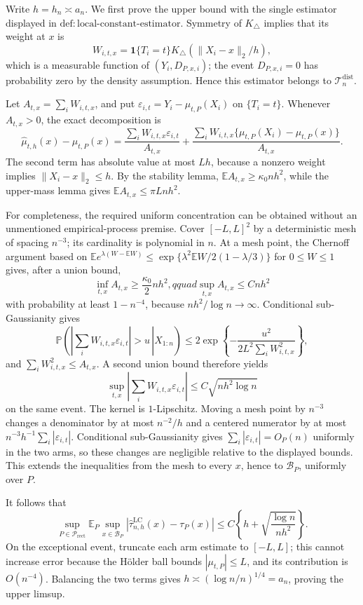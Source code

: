 Write \(h=h_n\asymp a_n\).  We first prove the upper bound with the single estimator displayed in \(\mathrm{def:local\text{-}constant\text{-}estimator}\).  Symmetry of \(K_\triangle\) implies that its weight at \(x\) is
\[
 W_{i,t,x}=\mathbf 1\{T_i=t\}K_\triangle(\lVert X_i-x\rVert_2/h),
\]
which is a measurable function of \((Y_i,D_{P,x,i})\); the event \(D_{P,x,i}=0\) has probability zero by the density assumption.  Hence this estimator belongs to \(\mathcal T_n^{\mathrm{dist}}\).

Let \(A_{t,x}=\sum_iW_{i,t,x}\), and put \(\varepsilon_{i,t}=Y_i-\mu_{t,P}(X_i)\) on \(\{T_i=t\}\).  Whenever \(A_{t,x}>0\), the exact decomposition is
\[
 \widehat\mu_{t,h}(x)-\mu_{t,P}(x)
 =\frac{\sum_iW_{i,t,x}\varepsilon_{i,t}}{A_{t,x}}
 +\frac{\sum_iW_{i,t,x}\{\mu_{t,P}(X_i)-\mu_{t,P}(x)\}}{A_{t,x}}.
\]
The second term has absolute value at most \(Lh\), because a nonzero weight implies \(\lVert X_i-x\rVert_2\leq h\).  By the stability lemma,
\(\mathbb EA_{t,x}\geq\kappa_0nh^2\), while the upper-mass lemma gives \(\mathbb EA_{t,x}\leq\pi Lnh^2\).

For completeness, the required uniform concentration can be obtained without an unmentioned empirical-process premise.  Cover \([-L,L]^2\) by a deterministic mesh of spacing \(n^{-3}\); its cardinality is polynomial in \(n\).  At a mesh point, the Chernoff argument based on
\(\mathbb E e^{\lambda(W-\mathbb EW)}\leq\exp\{\lambda^2\mathbb EW/2(1-\lambda/3)\}\) for \(0\leq W\leq1\) gives, after a union bound,
\[
 \inf_{t,x}A_{t,x}\geq\frac{\kappa_0}{2}nh^2,qquad
 \sup_{t,x}A_{t,x}\leq Cnh^2
\]
with probability at least \(1-n^{-4}\), because \(nh^2/\log n\to\infty\).  Conditional sub-Gaussianity gives
\[
 \mathbb P\!\left(\left.\left|\sum_iW_{i,t,x}\varepsilon_{i,t}\right|>u\,\right|X_{1:n}\right)
 \leq2\exp\!\left\{-\frac{u^2}{2L^2\sum_iW_{i,t,x}^2}\right\},
\]
and \(\sum_iW_{i,t,x}^2\leq A_{t,x}\).  A second union bound therefore yields
\[
 \sup_{t,x}\left|\sum_iW_{i,t,x}\varepsilon_{i,t}\right|
 \leq C\sqrt{nh^2\log n}
\]
on the same event.  The kernel is \(1\)-Lipschitz.  Moving a mesh point by \(n^{-3}\) changes a denominator by at most \(n^{-2}/h\) and a centered numerator by at most \(n^{-3}h^{-1}\sum_i|\varepsilon_{i,t}|\).  Conditional sub-Gaussianity gives \(\sum_i|\varepsilon_{i,t}|=O_P(n)\) uniformly in the two arms, so these changes are negligible relative to the displayed bounds.  This extends the inequalities from the mesh to every \(x\), hence to \(\mathcal B_P\), uniformly over \(P\).

It follows that
\[
 \sup_{P\in\mathcal P_{\mathrm{rect}}}\mathbb E_P\sup_{x\in\mathcal B_P}
 |\widehat\tau^{\mathrm{LC}}_{n,h}(x)-\tau_P(x)|
 \leq C\left\{h+\sqrt{\frac{\log n}{nh^2}}\right\}.
\]
On the exceptional event, truncate each arm estimate to \([-L,L]\); this cannot increase error because the H\"older ball bounds \(|\mu_{t,P}|\leq L\), and its contribution is \(O(n^{-4})\).  Balancing the two terms gives \(h\asymp(\log n/n)^{1/4}=a_n\), proving the upper limsup.

